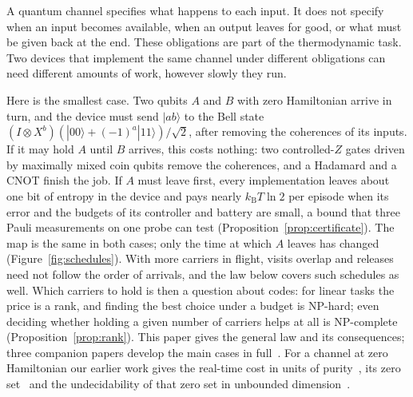 \documentclass[11pt]{article}
\theoremstyle{definition}
\theoremstyle{remark}
\newcommand{\kB}{k_{\mathrm B}}
\begin{document}
A quantum channel specifies what happens to each input. It does not specify when an input becomes available, when an output leaves for good, or what must be given back at the end. These obligations are part of the thermodynamic task. Two devices that implement the same channel under different obligations can need different amounts of work, however slowly they run.

Here is the smallest case. Two qubits $A$ and $B$ with zero Hamiltonian arrive in turn, and the device must send $|ab\rangle$ to the Bell state $(I\otimes X^b)(|00\rangle+(-1)^a|11\rangle)/\sqrt2$, after removing the coherences of its inputs. If it may hold $A$ until $B$ arrives, this costs nothing: two controlled-$Z$ gates driven by maximally mixed coin qubits remove the coherences, and a Hadamard and a CNOT finish the job. If $A$ must leave first, every implementation leaves about one bit of entropy in the device and pays nearly $\kB T\ln2$ per episode when its error and the budgets of its controller and battery are small, a bound that three Pauli measurements on one probe can test (Proposition~\ref{prop:certificate}). The map is the same in both cases; only the time at which $A$ leaves has changed (Figure~\ref{fig:schedules}). With more carriers in flight, visits overlap and releases need not follow the order of arrivals, and the law below covers such schedules as well. Which carriers to hold is then a question about codes: for linear tasks the price is a rank, and finding the best choice under a budget is NP-hard; even deciding whether holding a given number of carriers helps at all is NP-complete (Proposition~\ref{prop:rank}). This paper gives the general law and its consequences; three companion papers develop the main cases in full~\cite{SaveWork,Answering,KeepingTime}. For a channel at zero Hamiltonian our earlier work gives the real-time cost in units of purity~\cite{ClosedMemory,ImmediateDelivery}, its zero set~\cite{Memory} and the undecidability of that zero set in unbounded dimension~\cite{Flagship}.
\end{document}
